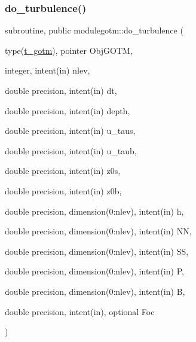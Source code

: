 \subsubsection{\texorpdfstring{do\+\_\+turbulence()}{do\_turbulence()}}
{\footnotesize\ttfamily subroutine, public modulegotm\+::do\+\_\+turbulence (\begin{DoxyParamCaption}\item[{type(\mbox{\hyperlink{structmodulegotm_1_1t__gotm}{t\+\_\+gotm}}), pointer}]{Obj\+G\+O\+TM,  }\item[{integer, intent(in)}]{nlev,  }\item[{double precision, intent(in)}]{dt,  }\item[{double precision, intent(in)}]{depth,  }\item[{double precision, intent(in)}]{u\+\_\+taus,  }\item[{double precision, intent(in)}]{u\+\_\+taub,  }\item[{double precision, intent(in)}]{z0s,  }\item[{double precision, intent(in)}]{z0b,  }\item[{double precision, dimension(0\+:nlev), intent(in)}]{h,  }\item[{double precision, dimension(0\+:nlev), intent(in)}]{NN,  }\item[{double precision, dimension(0\+:nlev), intent(in)}]{SS,  }\item[{double precision, dimension(0\+:nlev), intent(in)}]{P,  }\item[{double precision, dimension(0\+:nlev), intent(in)}]{B,  }\item[{double precision, intent(in), optional}]{Foc }\end{DoxyParamCaption})}

